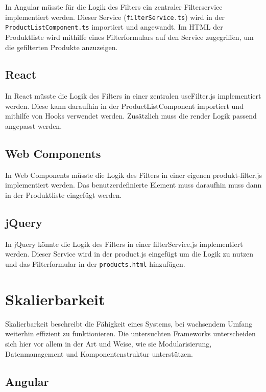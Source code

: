 \documentclass[oneside]{ausarbeitung}
\begin{document}
In Angular müsste für die Logik des Filters ein zentraler Filterservice implementiert werden. Dieser Service (\texttt{filterService.ts}) wird in der \texttt{ProductListComponent.ts} importiert und angewandt. Im HTML der Produktliste wird mithilfe eines Filterformulars auf den Service zugegriffen, um die gefilterten Produkte anzuzeigen.

\subsection{React}

In React müsste die Logik des Filters in einer zentralen useFilter.js implementiert werden. Diese kann daraufhin in der ProductListComponent importiert und mithilfe von Hooks verwendet werden. Zusätzlich muss die render Logik passend angepasst werden. 

\subsection{Web Components}

In Web Components müsste die Logik des Filters in einer eigenen produkt-filter.js implementiert werden. Das benutzerdefinierte Element muss daraufhin muss dann in der Produktliste eingefügt werden. 

\subsection{jQuery}

In jQuery könnte die Logik des Filters in einer filterService.js implementiert werden. 
Dieser Service wird in der product.js eingefügt um die Logik zu nutzen und das Filterformular in der \texttt{products.html} hinzufügen. 

\section{Skalierbarkeit}

Skalierbarkeit beschreibt die Fähigkeit eines Systems, bei wachsendem Umfang weiterhin effizient zu funktionieren. Die untersuchten Frameworks unterscheiden sich hier vor allem in der Art und Weise, wie sie Modularisierung, Datenmanagement und Komponentenstruktur unterstützen.

\subsection{Angular}
\end{document}
